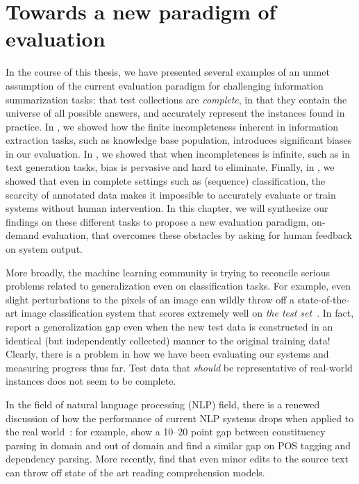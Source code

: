\chapter[Towards a new paradigm of evaluation]{\label{chap:discussion} Towards a new paradigm of evaluation}

In the course of this thesis, we have presented several examples of an unmet assumption of the current evaluation paradigm for challenging information summarization tasks: that test collections are \textit{complete}, in that they contain the universe of all possible answers, and accurately represent the instances found in practice.
In , we showed how the finite incompleteness inherent in information extraction tasks, such as knowledge base population, introduces significant biases in our evaluation.
In , we showed that when incompleteness is infinite, such as in text generation tasks, bias is pervasive and hard to eliminate.
Finally, in , we showed that even in complete settings such as (sequence) classification, the scarcity of annotated data makes it impossible to accurately evaluate or train systems without human intervention.
In this chapter, we will synthesize our findings on these different tasks to propose a new evaluation paradigm, on-demand evaluation, that overcomes these obstacles by asking for human feedback on system output.

More broadly, the machine learning community is trying to reconcile serious problems related to generalization even on classification tasks.
For example, even slight perturbations to the pixels of an image can wildly throw off a state-of-the-art image classification system that scores extremely well on \textit{the test set}~\citep{goodfellow2015explaining,carlini2016defensive,carlini2017adversarial}.
In fact, \citet{recht2018cifar} report a generalization gap even when the new test data is constructed in an identical (but independently collected) manner to the original training data!
Clearly, there is a problem in how we have been evaluating our systems and measuring progress thus far.
Test data that \textit{should} be representative of real-world instances does not seem to be complete.

In the field of natural language processing (NLP) field,
  there is a renewed discussion of how the performance of current NLP systems drops when applied to the real world~\citep{plank16nonstandard}:
for example, \citet{mcclosky2010any} show a 10--20 point gap between constituency parsing in domain and out of domain and \citet{foster2011news} find a similar gap on POS tagging and dependency parsing.
More recently, \citet{jia2017adversarial} find that even minor edits to the source text can throw off state of the art reading comprehension models.


